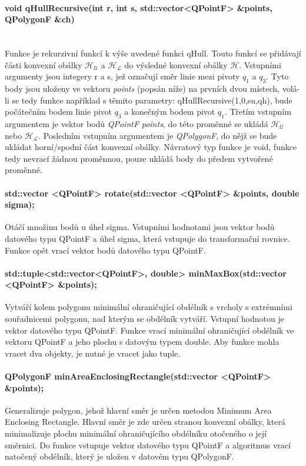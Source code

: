 \documentclass[11pt]{article}
\begin{document}
		\paragraph{void qHullRecursive(int r, int s, std::vector<QPointF> \&points, QPolygonF \&ch)}\mbox{}\\
		Funkce je rekurzivní funkcí k výše uvedené funkci qHull. Touto funkcí se přidávají části konvexní obálky $\mathcal{H_U}$ a $\mathcal{H_L}$ do výsledné konvexní obálky $\mathcal{H}$.
	 	Vstupními argumenty jsou integery r a s, jež označují směr linie mezi pivoty \textit{$ q_1 $} a \textit{$ q_3 $}. Tyto body jsou uloženy ve vektoru \textit{points} (popsán níže) na prvních dvou místech, volá-li se tedy funkce například s těmito parametry: qHullRecursive(1,0,su,qh), bude počátečním bodem linie pivot \textit{$ q_3 $} a konečným bodem pivot \textit{$ q_1 $}. Třetím vstupním argumentem je vektor bodů \textit{QPointF} \textit{points}, do této proměnné se ukládá  $\mathcal{H_U}$ nebo $\mathcal{H_L}$. Posledním vstupním argumentem je \textit{QPolygonF}, do nějž se bude ukládat horní/spodní část konvexní obálky. Návratový typ funkce je void, funkce tedy nevrací žádnou proměnnou, pouze ukládá body do předem vytvořené proměnné.
	 	
	 	\paragraph{std::vector <QPointF> rotate(std::vector <QPointF> \&points, double sigma);}
	 	Otáčí množinu bodů u úhel sigma. Vstupními hodnotami jsou vektor bodů datového typu QPointF a úhel sigma, která vstupuje do transformační rovnice. Funkce opět vrací vektor bodů datového typu QPointF.
	 	
	 	\paragraph{std::tuple<std::vector<QPointF>, double> minMaxBox(std::vector <QPointF> \&points);}
	 	Vytváří kolem polygonu minimální ohraničující obdélník s vrcholy s extrémními souřadnicemi polygonu, nad kterým se obdélník vytváří. Vstupní hodnotou je vektor datového typu QPointF. Funkce vrací minimální ohraničující obdélník ve vektoru QPointF a jeho plochu s datovým typem double. Aby funkce mohla vracet dva objekty, je nutné je vracet jako tuple.
	 	
	 	\paragraph{QPolygonF minAreaEnclosingRectangle(std::vector <QPointF> \&points);}
	 	Generalizuje polygon, jehož hlavní směr je určen metodou Minimum Area Enclosing Rectangle. Hlavní směr je zde určen stranou konvexní obálky, která minimalizuje plochu minimální  ohraničujícího obdélníku otočeného o její směrnici. Do funkce vstupuje vektor datového typu QPointF a algoritmus vrací natočený obdélník, který je uložen v datovém typu QPolygonF.
	 	
\end{document}
